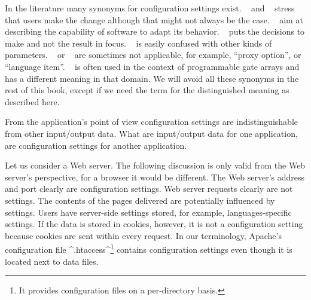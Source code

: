 In the literature many synonyms for configuration settings exist.
~\cite{jin2014configurations} and ~\cite{anderson2002researching} stress that users make the change although that might not always be the case.
~\cite{gunther2012software,rhein2016variability,villela2014survey,van2001notion,nadi2014mining,mens2016taxonomy} aim at describing the capability of software to adapt its behavior.
~\cite{software1993reuse,czarnecki2012cool} puts the decisions to make and not the result in focus.
~\cite{yin2011empirical,anderson1994towards} is easily confused with other kinds of parameters.
~\cite{anthony2009context} or ~\cite{rabkin2011static,zhang2013automated,zhang2014configuration} are sometimes not applicable, for example, ``proxy option'', or ``language item''.
~\cite{huang2015confvalley} is often used in the context of programmable gate arrays and has a different meaning in that domain.
We will avoid all these synonyms in the rest of this book, except if we need the term for the distinguished meaning as described here.

From the application's point of view configuration settings are indistinguishable from other input/output data.
What are input/output data for one application, are configuration settings for another application.
\begin{example}
Let us consider a Web server.
The following discussion is only valid from the Web server's perspective, for a browser it would be different.
The Web server's address and port clearly are configuration settings.
Web server requests clearly are not settings.
The contents of the pages delivered are potentially influenced by settings.
Users have server-side settings stored, for example, languages-specific settings.
If the data is stored in cookies, however, it is not a configuration setting because cookies are sent within every request.
In our terminology, Apache's configuration file ^.htaccess^\footnote{It provides configuration files on a per-directory basis.} contains configuration settings even though it is located next to data files.
\end{example}


